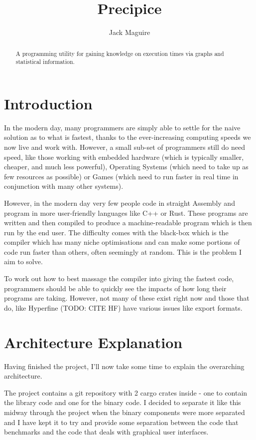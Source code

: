 \documentclass{article}
\title{Precipice}
\author{Jack Maguire}
\date{}
\begin{document}
\maketitle

\begin{abstract}
	A programming utility for gaining knowledge on execution times via graphs and statistical information.
\end{abstract}

\tableofcontents

\newpage

\section{Introduction}

In the modern day, many programmers are simply able to settle for the naive solution as to what is fastest, thanks to the ever-increasing computing speeds we now live and work with. However, a small sub-set of programmers still do need speed, like those working with embedded hardware (which is typically smaller, cheaper, and much less powerful), Operating Systems (which need to take up as few resources as possible) or Games (which need to run faster in real time in conjunction with many other systems).

However, in the modern day very few people code in straight Assembly and program in more user-friendly languages like C++ or Rust. These programs are written and then compiled to produce a machine-readable program which is then run by the end user. The difficulty comes with the black-box which is the compiler which has many niche optimisations and can make some portions of code run faster than others, often seemingly at random. This is the problem I aim to solve.

To work out how to best massage the compiler into giving the fastest code, programmers should be able to quickly see the impacts of how long their programs are taking. However, not many of these exist right now and those that do, like Hyperfine (TODO: CITE HF) have various issues like export formats.

\section{Architecture Explanation}

Having finished the project, I'll now take some time to explain the overarching architecture.

The project contains a git repository with 2 cargo crates inside - one to contain the library code and one for the binary code. I decided to separate it like this midway through the project when the binary components were more separated and I have kept it to try and provide some separation between the code that benchmarks and the code that deals with graphical user interfaces.
\end{document}
